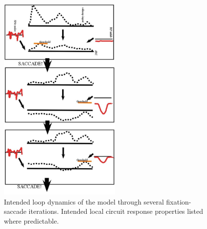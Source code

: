 \documentclass[conference]{IEEEtran}
\begin{document}
\begin{figure} [!t]
\centering
\includegraphics[width=6.0cm]{looking_functional_loop.jpg}
\caption{Intended loop dynamics of the model through several
  fixation-saccade iterations. Intended local circuit response
  properties listed where predictable.}
\label{fig:looking_functional_loop}
\end{figure}
\end{document}
